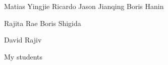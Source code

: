 Matias
Yingjie
Ricardo
Jason
Jianqing
Boris Hanin

Rajita
Rae
Boris Shigida

David
Rajiv

My students
